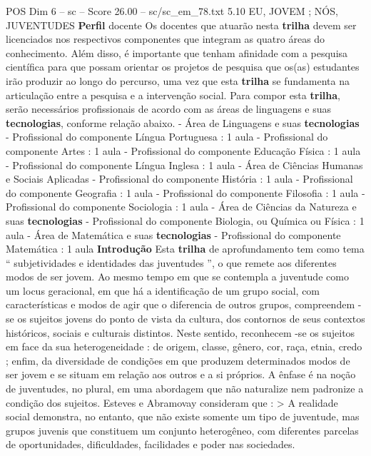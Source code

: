 \begin{textsample}{POS Dim 6 – sc – Score 26.00 – sc/sc\_em\_78.txt}  \label{ex:f6_pos_012}
5.10 EU, JOVEM ; NÓS, JUVENTUDES \textbf{Perfil} docente Os docentes que atuarão nesta \textbf{trilha} devem ser licenciados nos respectivos componentes que integram as quatro áreas do conhecimento.
Além disso, é importante que tenham afinidade com a pesquisa científica para que possam orientar os projetos de pesquisa que os(as) estudantes irão produzir ao longo do percurso, uma vez que esta \textbf{trilha} se fundamenta na articulação entre a pesquisa e a intervenção social.
Para compor esta \textbf{trilha}, serão necessários profissionais de acordo com as áreas de linguagens e suas \textbf{tecnologias}, conforme relação abaixo. - Área de Linguagens e suas \textbf{tecnologias} - Profissional do componente Língua Portuguesa : 1 aula - Profissional do componente Artes : 1 aula - Profissional do componente Educação Física : 1 aula - Profissional do componente Língua Inglesa : 1 aula - Área de Ciências Humanas e Sociais Aplicadas - Profissional do componente História : 1 aula - Profissional do componente Geografia : 1 aula - Profissional do componente Filosofia : 1 aula - Profissional do componente Sociologia : 1 aula - Área de Ciências da Natureza e suas \textbf{tecnologias} - Profissional do componente Biologia, ou Química ou Física : 1 aula - Área de Matemática e suas \textbf{tecnologias} - Profissional do componente Matemática : 1 aula \textbf{Introdução} Esta \textbf{trilha} de aprofundamento tem como tema “ subjetividades e identidades das juventudes ”, o que remete aos diferentes modos de ser jovem.
Ao mesmo tempo em que se contempla a juventude como um locus geracional, em que há a identificação de um grupo social, com características e modos de agir que o diferencia de outros grupos, compreendem -se os sujeitos jovens do ponto de vista da cultura, dos contornos de seus contextos históricos, sociais e culturais distintos.
Neste sentido, reconhecem -se os sujeitos em face da sua heterogeneidade : de origem, classe, gênero, cor, raça, etnia, credo ; enfim, da diversidade de condições em que produzem determinados modos de ser jovem e se situam em relação aos outros e a si próprios.
A ênfase é na noção de juventudes, no plural, em uma abordagem que não naturalize nem padronize a condição dos sujeitos.
Esteves e Abramovay consideram que : > A realidade social demonstra, no entanto, que não existe somente um tipo de juventude, mas grupos juvenis que constituem um conjunto heterogêneo, com diferentes parcelas de oportunidades, dificuldades, facilidades e poder nas sociedades.

\end{textsample}
